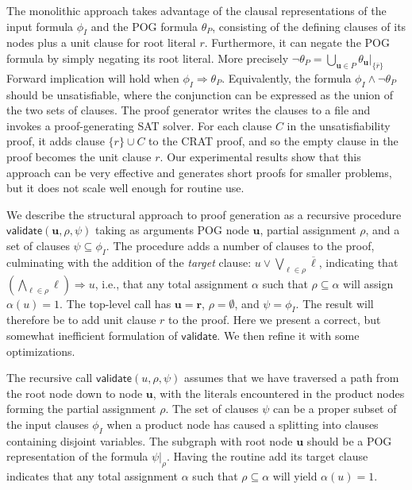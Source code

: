 \documentclass[letterpaper,USenglish,cleveref, autoref, thm-restate]{lipics-v2021}
\newcommand{\obar}[1]{\overline{#1}}
\newcommand{\lit}{\ell}
\newcommand{\imply}{\Rightarrow}
\newcommand{\assign}{\alpha}
\newcommand{\passign}{\rho}
\newcommand{\validate}{\textsf{validate}}
\newcommand{\inputformula}{\phi_I}
\newcommand{\pogformula}{\theta_P}
\newcommand{\makenode}[1]{\mathbf{#1}}
\newcommand{\nodeu}{\makenode{u}}
\newcommand{\noder}{\makenode{r}}
\newcommand{\simplify}[2]{#1|_{#2}}
\begin{document}
The monolithic approach
takes advantage of the clausal representations of
the input formula $\inputformula$ and the POG formula $\pogformula$, consisting of the defining clauses of its nodes plus a unit clause for root literal $r$.
Furthermore, it can
negate the POG formula by simply negating its root literal.  More precisely $\neg \pogformula = \bigcup_{\nodeu\in P} \simplify{\theta_{\nodeu}}{\{\obar{r}\}}$
Forward implication
will hold
when $\inputformula \imply \pogformula$.  Equivalently,
the formula $\inputformula \land \neg \pogformula$
should be unsatisfiable, where the
conjunction can be expressed as the union
of the two sets of clauses.  The proof generator writes the clauses to a file and invokes a proof-generating SAT solver.
For each clause $C$ in the unsatisfiability proof, it adds clause $\{r\} \cup C$ to the CRAT proof, and so the empty clause in the proof becomes the unit clause $r$.
Our experimental results show
that this approach can be very effective and generates short proofs
for smaller problems, but it does not scale well enough for routine
use.


We describe the structural approach to proof generation as a recursive procedure
$\validate(\nodeu, \passign, \psi)$ taking as arguments POG
node $\nodeu$, partial assignment
$\passign$, and a set of clauses $\psi \subseteq \inputformula$.
The procedure adds a number of clauses to the proof, culminating with
the addition of the {\em target} clause:
$u \lor \bigvee_{\lit \in \passign} \obar{\lit}$, indicating
that $\left(\bigwedge_{\lit \in \passign} \lit\right) \imply u$, i.e.,
that any total
assignment $\assign$ such that $\passign \subseteq \assign$
will assign $\assign(u) = 1$.
The top-level call has $\nodeu = \noder$, $\passign = \emptyset$, and $\psi = \inputformula$.
The result will therefore be to add unit clause $r$ to the proof.
Here we present a correct, but somewhat inefficient formulation of
$\validate$.  We then refine it with some optimizations.

The recursive call $\validate(u, \passign, \psi)$ assumes that we have
traversed a path from the root node down to node $\nodeu$, with the
literals encountered in the product nodes forming the partial
assignment $\passign$.  The set of clauses $\psi$ can be a proper
subset of the input clauses $\inputformula$ when a product node has caused
a splitting into clauses containing disjoint variables.
The subgraph with root node $\nodeu$ should be a POG representation of the formula
$\simplify{\psi}{\passign}$.  Having the
routine add its target clause indicates that any total assignment
$\assign$ such that $\passign \subseteq \assign$ will yield $\alpha(u) = 1$.
\end{document}
